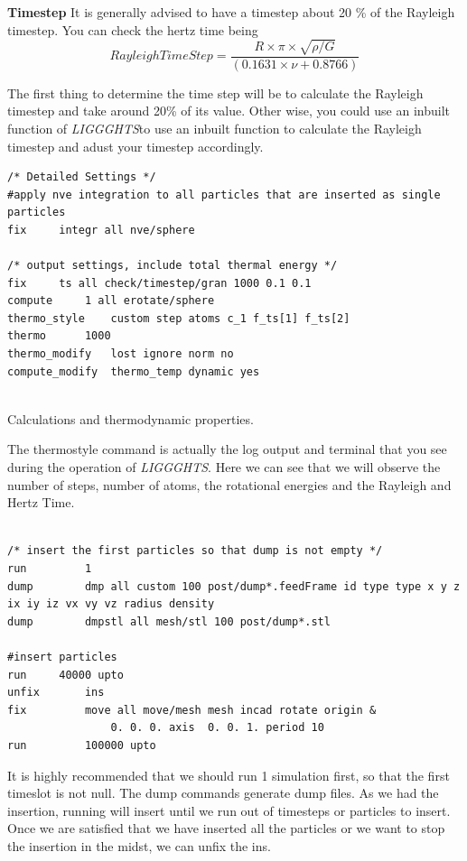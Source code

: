 \documentclass{tufte-book} %
\newcommand{\Li}{\textit{LIGGGHTS}}
\begin{document}
\textbf{Timestep} It is generally advised to have a timestep about 20 \% of the Rayleigh timestep. You can check the hertz time being
$$ Rayleigh Time Step =  \frac{R\times\pi\times\sqrt{\rho/G}}{(0.1631\times\nu + 0.8766)} $$

The first thing to determine the time step will be to calculate the Rayleigh timestep and take around 20\% of its value. Other wise, you could use an inbuilt function of \Li to use an inbuilt function to calculate the Rayleigh timestep and adust your timestep accordingly.


\begin{verbatim}
/* Detailed Settings */
#apply nve integration to all particles that are inserted as single particles
fix		integr all nve/sphere

/* output settings, include total thermal energy */
fix		ts all check/timestep/gran 1000 0.1 0.1
compute		1 all erotate/sphere
thermo_style	custom step atoms c_1 f_ts[1] f_ts[2]  
thermo		1000
thermo_modify	lost ignore norm no
compute_modify	thermo_temp dynamic yes


\end{verbatim}

 Calculations and thermodynamic properties.
 
The thermostyle command is actually the log output and terminal that you see during the operation of \Li. Here we can see that we will observe the number of steps, number of atoms, the rotational energies and the Rayleigh and Hertz Time.
\begin{verbatim}

/* insert the first particles so that dump is not empty */
run			1
dump		dmp all custom 100 post/dump*.feedFrame id type type x y z ix iy iz vx vy vz radius density  
dump 		dmpstl all mesh/stl 100 post/dump*.stl

#insert particles
run		40000 upto
unfix		ins
fix 		move all move/mesh mesh incad rotate origin &
                0. 0. 0. axis  0. 0. 1. period 10
run 		100000 upto 

\end{verbatim}
It is highly recommended that we should run 1 simulation first, so that the first timeslot is not null.
The dump commands generate dump files.
As we had the insertion, running will insert until we run out of timesteps or particles to insert. Once we are satisfied  that we have inserted all the particles or we want to stop the insertion in the midst, we can unfix the ins.
\end{document}
